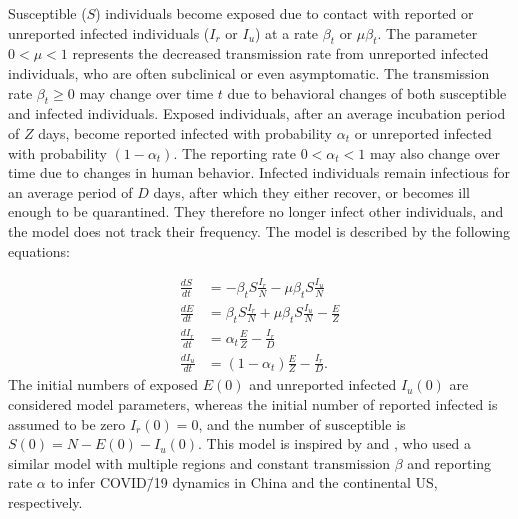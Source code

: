 \documentclass[12pt]{extarticle}
\begin{document}
Susceptible ($S$) individuals become exposed due to contact with reported or unreported infected individuals ($I_r$ or $I_u$) at a rate $\beta_t$ or $\mu \beta_t$.
The parameter $0 < \mu < 1$ represents the decreased transmission rate from unreported infected individuals, who are often subclinical or even asymptomatic.
The transmission rate $\beta_t \ge 0$ may change over  time $t$ due to behavioral changes of both susceptible and infected individuals.
Exposed individuals, after an average incubation period of $Z$ days, become reported infected with probability $\alpha_t$ or unreported infected with probability $(1-\alpha_t)$.
The reporting rate $0 < \alpha_t < 1$ may also change over time due to changes in human behavior.
Infected individuals remain infectious for an average period of $D$ days, after which they either recover, or becomes ill enough to be quarantined.
They therefore no longer infect other individuals, and the model does not track their frequency.
The model is described by the following equations:

\begin{equation} \label{eq:model}
\begin{aligned}
\frac{dS}{dt} & = -\beta_t S \frac{I_r}{N} - \mu \beta_t S \frac{I_u}{N} \\
\frac{dE}{dt} & = \beta_t S \frac{I_r}{N} + \mu \beta_t S \frac{I_u}{N}  - \frac{E}{Z} \\
\frac{dI_r}{dt} & = \alpha_t \frac{E}{Z} - \frac{I_r}{D} \\
\frac{dI_u}{dt} & = (1-\alpha_t) \frac{E}{Z} - \frac{I_r}{D} .
\end{aligned}
\end{equation}
The initial numbers of exposed $E(0)$ and unreported infected $I_u(0)$ are considered model parameters, whereas the initial number of reported infected is assumed to be zero $I_r(0)=0$, and the number of susceptible is $S(0)=N-E(0)-I_u(0)$.
This model is inspired by \citet{Li2020} and \citet{Pei2020}, who used a similar model with multiple regions and constant transmission $\beta$ and reporting rate $\alpha$ to infer COVID\=/19 dynamics in China and the continental US, respectively.



\end{document}
